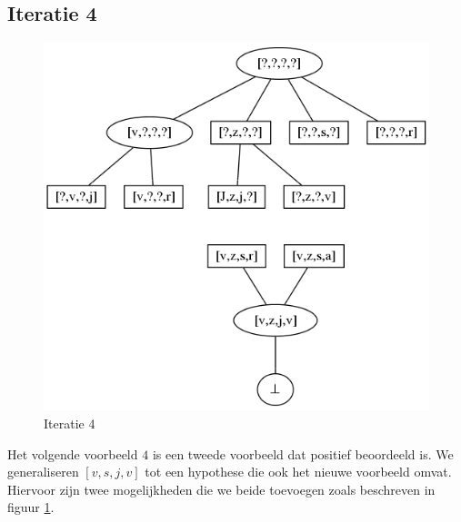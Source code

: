 \documentclass[alternative-exam.tex]{subfiles}
\begin{document}
\subsection{Iteratie 4}
\begin{figure}
[H]
\centering
\caption{Iteratie 4}
\label{iter_4}
\includegraphics[scale=0.5]{resources/graphs/iteration_4.png}
\end{figure}
Het volgende voorbeeld $4$ is een tweede voorbeeld dat positief beoordeeld is. We generaliseren $[v,s,j,v]$ tot een hypothese die ook het nieuwe voorbeeld omvat. Hiervoor zijn twee mogelijkheden die we beide toevoegen zoals beschreven in figuur \ref{iter_4}.
\end{document}
